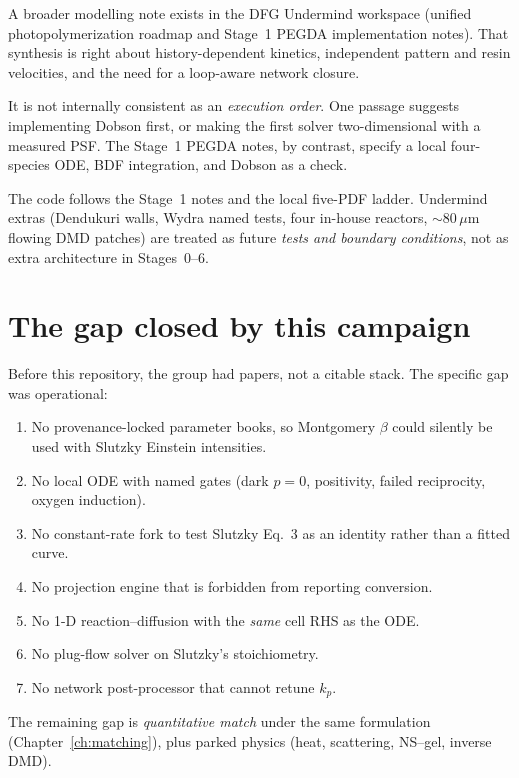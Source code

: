 A broader modelling note exists in the DFG Undermind workspace (unified photopolymerization roadmap and Stage~1 PEGDA implementation notes).
That synthesis is right about history-dependent kinetics, independent pattern and resin velocities, and the need for a loop-aware network closure.

It is not internally consistent as an \emph{execution order}.
One passage suggests implementing Dobson first, or making the first solver two-dimensional with a measured PSF.
The Stage~1 PEGDA notes, by contrast, specify a local four-species ODE, BDF integration, and Dobson as a check.

The code follows the Stage~1 notes and the local five-PDF ladder.
Undermind extras (Dendukuri walls, Wydra named tests, four in-house reactors, $\sim 80\,\mu\mathrm{m}$ flowing DMD patches) are treated as future \emph{tests and boundary conditions}, not as extra architecture in Stages~0--6.

\section{The gap closed by this campaign}

Before this repository, the group had papers, not a citable stack.
The specific gap was operational:

\begin{enumerate}
  \item No provenance-locked parameter books, so Montgomery $\beta$ could silently be used with Slutzky Einstein intensities.
  \item No local ODE with named gates (dark $p=0$, positivity, failed reciprocity, oxygen induction).
  \item No constant-rate fork to test Slutzky Eq.~3 as an identity rather than a fitted curve.
  \item No projection engine that is forbidden from reporting conversion.
  \item No 1-D reaction--diffusion with the \emph{same} cell RHS as the ODE.
  \item No plug-flow solver on Slutzky's stoichiometry.
  \item No network post-processor that cannot retune $k_p$.
\end{enumerate}

The remaining gap is \emph{quantitative match} under the same formulation (Chapter~\ref{ch:matching}), plus parked physics (heat, scattering, NS--gel, inverse DMD).
